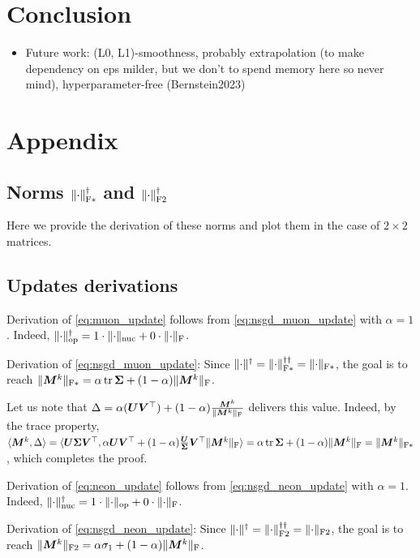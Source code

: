 \documentclass{article} %
\newcommand{\norm}[1]{\lVert #1\rVert}
\DeclarePairedDelimiter{\normf}{\|}{\|_\mathrm{F}}
\DeclarePairedDelimiter{\normfstar}{\|}{\|_\mathrm{F*}}
\DeclarePairedDelimiter{\normftwo}{\|}{\|_\mathrm{F2}}
\DeclarePairedDelimiter{\norms}{\|}{\|_{\mathrm{op}}}
\DeclarePairedDelimiter{\normn}{\|}{\|_{\mathrm{nuc}}}
\def\<#1,#2>{\langle #1,#2\rangle}
\DeclareMathOperator{\tr}{tr}
\begin{document}
\section{Conclusion}
\begin{itemize}
    \item Future work: (L0, L1)-smoothness, probably extrapolation (to make dependency on eps milder, but we don't to spend memory here so never mind), hyperparameter-free (Bernstein2023)
\end{itemize}






\section{Appendix}
\subsection{Norms $\normfstar{\cdot}^\dagger$ and $\normftwo{\cdot}^\dagger$}
Here we provide the derivation of these norms and plot them in the case of $2\times2$ matrices.
\subsection{Updates derivations}

Derivation of \cref{eq:muon_update} follows from \cref{eq:nsgd_muon_update} with $\alpha=1$. Indeed, $\norms{\cdot}^\dagger=1\cdot\normn{\cdot} + 0 \cdot \normf{\cdot} $.

Derivation of \cref{eq:nsgd_muon_update}:
Since $\norm{\cdot}^\dagger = \normfstar{\cdot}^{\dagger\dagger} = \normfstar{\cdot}$, the goal is to reach $\normfstar{\mM^k} = \alpha \tr{\mSigma} + (1-\alpha) \normf{\mM^k}$.

Let us note that $\Delta = \alpha (\mU \mV^\top) + (1-\alpha) \frac{\mM^k}{\normf{\mM^k}}$ delivers this value. Indeed, by the trace property, $\<\mM^k, \Delta> =\<\mU \mSigma \mV^\top, \alpha \mU \mV^\top + (1-\alpha) \frac{\mU \mSigma \mV^\top}{\normf{\mM^k}}> = \alpha \tr \mSigma + (1-\alpha) \normf{\mM^k} = \normfstar{\mM^k}$, which completes the proof.

Derivation of \cref{eq:neon_update} follows from \cref{eq:nsgd_neon_update} with $\alpha=1$. Indeed, $\normn{\cdot}^\dagger=1\cdot\norms{\cdot} + 0 \cdot \normf{\cdot} $.

Derivation of \cref{eq:nsgd_neon_update}:
Since $\norm{\cdot}^\dagger = \normftwo{\cdot}^{\dagger\dagger} = \normftwo{\cdot}$, the goal is to reach $\normftwo{\mM^k} = \alpha \sigma_1 + (1-\alpha) \normf{\mM^k}$.
\end{document}

